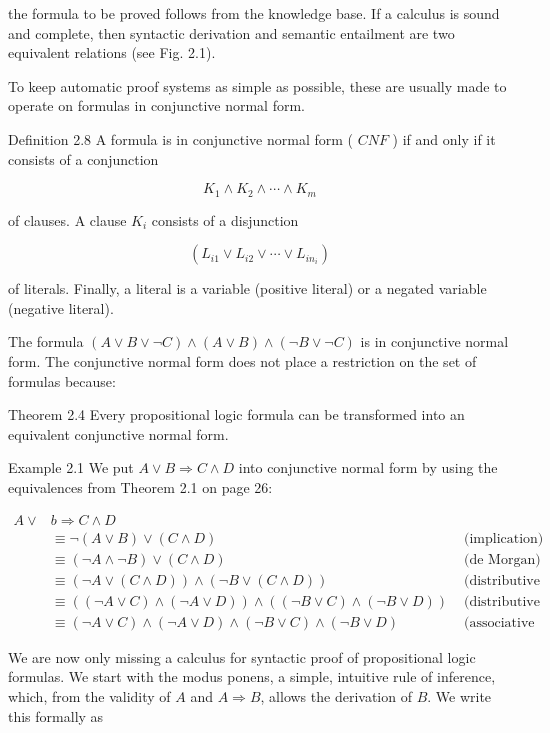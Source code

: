 \documentclass[10pt]{article}
\begin{document}
the formula to be proved follows from the knowledge base. If a calculus is sound and complete, then syntactic derivation and semantic entailment are two equivalent relations (see Fig. 2.1).

To keep automatic proof systems as simple as possible, these are usually made to operate on formulas in conjunctive normal form.

Definition 2.8 A formula is in conjunctive normal form ( $C N F$ ) if and only if it consists of a conjunction

$$
K_{1} \wedge K_{2} \wedge \cdots \wedge K_{m}
$$

of clauses. A clause $K_{i}$ consists of a disjunction

$$
\left(L_{i 1} \vee L_{i 2} \vee \cdots \vee L_{i n_{i}}\right)
$$

of literals. Finally, a literal is a variable (positive literal) or a negated variable (negative literal).

The formula $(A \vee B \vee \neg C) \wedge(A \vee B) \wedge(\neg B \vee \neg C)$ is in conjunctive normal form. The conjunctive normal form does not place a restriction on the set of formulas because:

Theorem 2.4 Every propositional logic formula can be transformed into an equivalent conjunctive normal form.

Example 2.1 We put $A \vee B \Rightarrow C \wedge D$ into conjunctive normal form by using the equivalences from Theorem 2.1 on page 26:

$$
\begin{array}{rlr}
A \vee & b \Rightarrow C \wedge D & \\
& \equiv \neg(A \vee B) \vee(C \wedge D) & \text { (implication) } \\
& \equiv(\neg A \wedge \neg B) \vee(C \wedge D) & \text { (de Morgan) } \\
& \equiv(\neg A \vee(C \wedge D)) \wedge(\neg B \vee(C \wedge D)) & \text { (distributive law) } \\
& \equiv((\neg A \vee C) \wedge(\neg A \vee D)) \wedge((\neg B \vee C) \wedge(\neg B \vee D)) & \text { (distributive law) } \\
& \equiv(\neg A \vee C) \wedge(\neg A \vee D) \wedge(\neg B \vee C) \wedge(\neg B \vee D) & \text { (associative law) }
\end{array}
$$

We are now only missing a calculus for syntactic proof of propositional logic formulas. We start with the modus ponens, a simple, intuitive rule of inference, which, from the validity of $A$ and $A \Rightarrow B$, allows the derivation of $B$. We write this formally as
\end{document}
